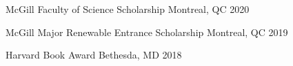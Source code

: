 



\begin{cvhonors}



  \cvhonor
    {McGill Faculty of Science Scholarship} %
    {} %
    {Montreal, QC} %
    {2020} %

    \cvhonor
    {McGill Major Renewable Entrance Scholarship} %
    {} %
    {Montreal, QC} %
    {2019} %

  \cvhonor
    {Harvard Book Award} %
    {} %
    {Bethesda, MD} %
    {2018} %

% 

\end{cvhonors}


% 
% 
% 
% 
% 
% 
